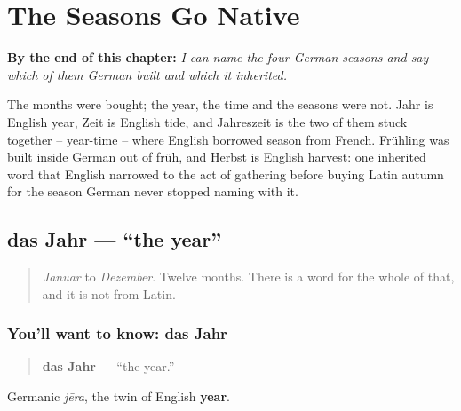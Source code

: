 
\chapter{The Seasons Go Native}
\label{ch:jahreszeiten}

\begin{chapteropening}
\textbf{By the end of this chapter:} \emph{I can name the four German seasons and say which of them German built and which it inherited.}

The months were bought; the year, the time and the seasons were not. Jahr is English year, Zeit is English tide, and Jahreszeit is the two of them stuck together -- year-time -- where English borrowed season from French. Frühling was built inside German out of früh, and Herbst is English harvest: one inherited word that English narrowed to the act of gathering before buying Latin autumn for the season German never stopped naming with it.
\end{chapteropening}

\section[das Jahr]{das Jahr — \textquotedblleft{}the year\textquotedblright{}}

\label{lesson:GE-C09-jahr}



\begin{quote}
\emph{Januar} to \emph{Dezember}. Twelve months. There is a word for the whole of that, and it is not from Latin.
\end{quote}

\subsection*{You'll want to know: das Jahr}
\begin{quote}
\textbf{das Jahr} — \textquotedblleft{}the year.\textquotedblright{}
\end{quote}

Germanic \emph{jēra}, the twin of English \textbf{year}.

